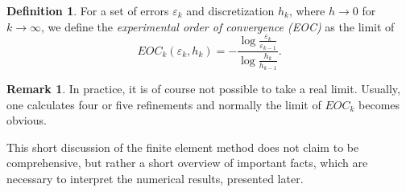\documentclass[12pt,a4paper,twoside, open=right]{scrreprt}
\theoremstyle{definition}
\newtheorem{rem}[auf]{Remark}
\newtheorem{defn}[auf]{Definition}
\theoremstyle{plain}
\begin{document}
\begin{defn}
    For a set of errors $\varepsilon_k$ and discretization $h_k$, where $h\to 0$ for $k\to\infty$, we define the \emph{experimental order of convergence (EOC)} as the limit of 
    \begin{equation}
        EOC_k(\varepsilon_k,h_k)=-\frac{\log\frac{\varepsilon_k}{\varepsilon_{k-1}}}{\log{\frac{h_k}{h_{k-1}}}}.\label{eq:EOC}
    \end{equation} 
\end{defn}
\begin{rem}
    In practice, it is of course not possible to take a real limit. Usually, one calculates four or five refinements and normally the limit of $EOC_k$ becomes obvious. 
\end{rem}
This short discussion of the finite element method does not claim to be comprehensive, but rather a short overview of important facts, which are necessary to interpret the numerical results, presented later.  
\end{document}
